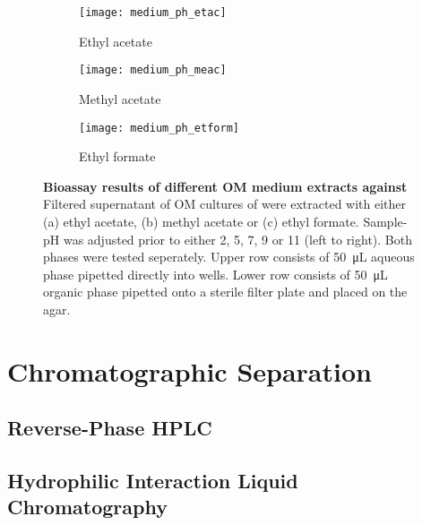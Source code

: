 	\begin{figure}[htbp]
		\centering
		\begin{subfigure}{\textwidth}
			\texttt{[image: medium\_ph\_etac]}
			\caption{Ethyl acetate}
		\end{subfigure}
		\begin{subfigure}{\textwidth}
			\texttt{[image: medium\_ph\_meac]}
			\caption{Methyl acetate}
		\end{subfigure}
		\begin{subfigure}{\textwidth}
			\texttt{[image: medium\_ph\_etform]}
			\caption{Ethyl formate}
		\end{subfigure}
		\caption[Bioassay results of different OM medium extracts against \coli]{%
			\textbf{Bioassay results of different OM medium extracts against \coli}
			Filtered supernatant of OM cultures of \tue were extracted with either (a) ethyl acetate, (b) methyl acetate or (c) ethyl formate.
			Sample-pH was adjusted prior to either 2, 5, 7, 9 or 11 (left to right).
			Both phases were tested seperately.
			Upper row consists of \SI{50}{\micro\liter} aqueous phase pipetted directly into wells.
			Lower row consists of \SI{50}{\micro\liter} organic phase pipetted onto a sterile filter plate and placed on the agar.}
		\label{fig:results_extraction_bioassay}
	\end{figure}
	
	

\section{Chromatographic Separation} %
\label{sec:results_chromatographic_separation}

    \subsection{Reverse-Phase HPLC} %
    \label{sub:results_reverse_phase_hplc}


    \subsection{Hydrophilic Interaction Liquid Chromatography} %
    \label{sub:results_hydrophilic_interaction_chromatography}
    

